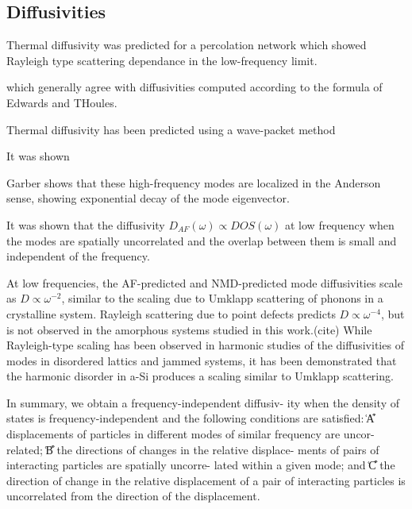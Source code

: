 \documentclass[aps,prb,twocolumn,superscriptaddress,footinbib,amsmath,amssymb,floatfix]{revtex4}
\begin{document}
\subsection{\label{S:Diffusivities}Diffusivities}


Thermal diffusivity was predicted for a percolation network which showed 
Rayleigh type scattering dependance in the low-frequency limit.
\cite{sheng_heat_1991}

which generally agree with diffusivities computed according to the 
formula of Edwards and THoules.\cite{edwards_numerical_1972,
feldman_numerical_1999,beltukov_ioffe-regel_2013}

Thermal diffusivity has been predicted using a wave-packet method

It was shown 

Garber shows that these high-frequency modes are localized in the 
Anderson sense, showing exponential decay of the mode eigenvector.
\cite{garber_numerical_2001}

It was shown that the diffusivity $D_{AF}(\omega) \propto DOS(\omega)$ 
at low frequency when the modes are spatially uncorrelated and the 
overlap between them is small and independent of the frequency.
\cite{vitelli_heat_2010,xu_energy_2009}

At low frequencies, the AF-predicted and NMD-predicted mode 
diffusivities scale as $D \propto \omega^{-2}$, similar to the scaling 
due to Umklapp scattering of phonons in a crystalline system. Rayleigh 
scattering due to point defects predicts $D \propto \omega^{-4}$, 
but is not observed in the amorphous systems studied in this work.(cite) 
While Rayleigh-type scaling has been 
observed in harmonic studies of the diffusivities of modes in 
disordered lattics and jammed systems,
\cite{sheng_heat_1991,xu_energy_2009,vitelli_heat_2010} 
it has been demonstrated that the harmonic disorder in a-Si 
produces a scaling similar to Umklapp scattering.
\cite{feldman_thermal_1993}

In summary, we obtain a frequency-independent diffusiv-
ity when the density of states is frequency-independent and
the following conditions are satisfied: ͑A͒ displacements of
particles in different modes of similar frequency are uncor-
related; ͑B͒ the directions of changes in the relative displace-
ments of pairs of interacting particles are spatially uncorre-
lated within a given mode; and ͑C͒ the direction of change in
the relative displacement of a pair of interacting particles is
uncorrelated from the direction of the displacement.
\end{document}
